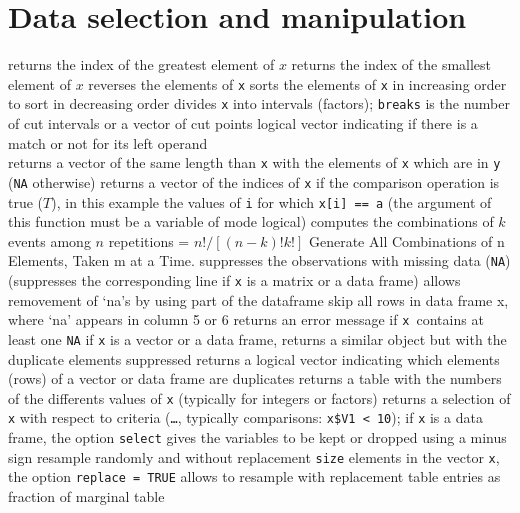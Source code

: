 \section{Data selection and manipulation}{}
	{ returns the index of the greatest element of $x$}
	{ returns the index of the smallest element of $x$}
	{ reverses the elements of {\tt x}}
	{sorts the elements of {\tt x} in increasing order}
	{to sort in decreasing order}
	{divides {\tt x} into intervals (factors); {\tt breaks} is the number of cut intervals or a vector of cut points}
	{logical vector indicating if there is a match or not for its left operand\\}
	{returns a vector of the same length than {\tt x}
    with the elements of {\tt x} which are in {\tt y} ({\tt NA}
    otherwise)}
	{returns a vector of the indices of {\tt x} if the
comparison operation is true ($T$), in this example the values of {\tt i} for
which {\tt x[i] == a} (the argument of this function must be a variable of mode
logical)}
	{ computes the combinations of $k$ events among $n$ repetitions = $n!/[(n-k)!k!]$}
	{ Generate All Combinations of n Elements, Taken m at a Time.}
	{suppresses the observations with missing data ({\tt NA}) (suppresses the corresponding line if {\tt x} is a matrix or a data frame)}
	{allows removement of `na's by using part of the dataframe} %
	{skip all rows in data frame x, where `na' appears in column 5 or 6}
	{returns an error message if {\tt x }contains at least one {\tt NA}}
	{if {\tt x} is a vector or a data frame, returns a similar object but with the duplicate elements suppressed}
	{returns a logical vector indicating which elements (rows) of a vector or data frame are duplicates}
	{returns a table with the numbers of the differents values of {\tt x} (typically for integers or factors)}
	{returns a selection of {\tt x} with respect to criteria ({\tt \ldots}, typically comparisons: {\tt x\$V1 < 10}); if {\tt x} is a data frame, the option {\tt select} gives the variables to be kept or dropped using a minus sign}
	{resample randomly and without replacement {\tt size}
elements in the vector {\tt x}, the option {\tt replace = TRUE} allows to
resample with replacement}
	{table entries as fraction of marginal table}

